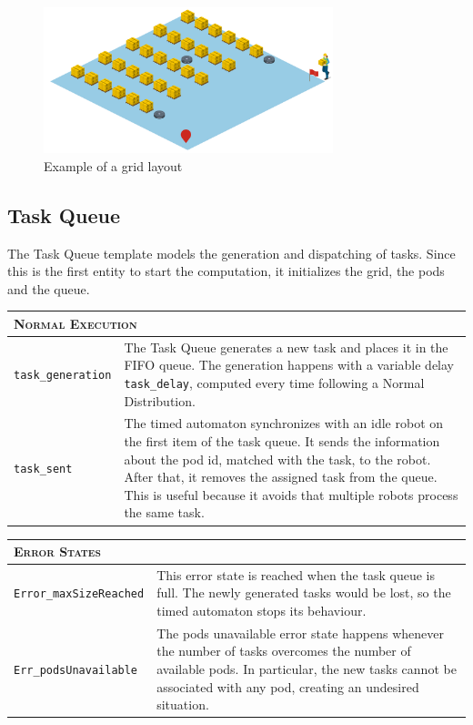 \begin{figure}
    \centering
    \includegraphics[width=0.75\textwidth]{resources/grid10x10.png}
    \caption{Example of a grid layout}
    \label{fig:grid10x10}
\end{figure}

\subsection{Task Queue}
The Task Queue template models the generation and dispatching of tasks. Since this is the first entity to start the computation, it initializes the grid, the pods and the queue. 

\noindent \begin{tabularx}{\textwidth}{lX}
\multicolumn{2}{l}{{\scshape Normal Execution}} \vspace{0,1cm}\\
\toprule
\texttt{task\_generation} & The Task Queue generates a new task and places it in the FIFO queue. The generation happens with a variable delay \texttt{task\_delay}, computed every time following a Normal Distribution. \vspace{0,2cm}\\
\texttt{task\_sent} & The timed automaton synchronizes with an idle robot on the first item of the task queue. It sends the information about the pod id, matched with the task, to the robot. After that, it removes the assigned task from the queue. This is useful because it avoids that multiple robots process the same task.\\
\end{tabularx}

\noindent \begin{tabularx}{\textwidth}{lX}
\multicolumn{2}{l}{{\scshape Error States}} \vspace{0,1cm}\\
\toprule
\texttt{Error\_maxSizeReached}  & This error state is reached when the task queue is full. The newly generated tasks would be lost, so the timed automaton stops its behaviour. \vspace{0,2cm}\\
\texttt{Err\_podsUnavailable}   & The pods unavailable error state happens whenever the number of tasks overcomes the number of available pods. In particular, the new tasks cannot be associated with any pod, creating an undesired situation. \vspace{0,2cm}\\
\end{tabularx}

